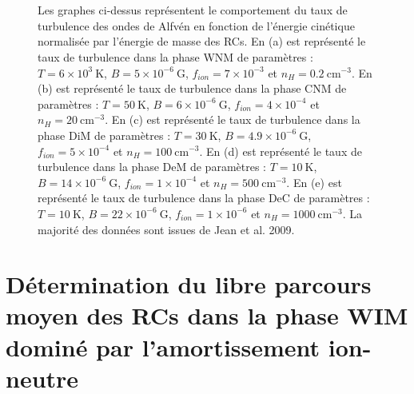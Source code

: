 \documentclass[10pt,a4paper]{article}
\begin{document}
 
\begin{figure}[t!]
  \begin{center}
     \\
      \\ 
    \caption{Les graphes ci-dessus représentent le comportement du taux de turbulence des ondes de Alfvén en fonction de l'énergie cinétique normalisée par l'énergie de masse des RCs. En (a) est représenté le taux de turbulence dans la phase WNM de paramètres : $T = 6\times 10^3~\mathrm{K}$, $B = 5\times 10^{-6}~\mathrm{G}$, $f_{ion} = 7\times 10^{-3}$ et $n_H = 0.2~\mathrm{cm}^{-3}$. En (b) est représenté le taux de turbulence dans la phase CNM de paramètres : $T = 50~\mathrm{K}$, $B = 6\times 10^{-6}~\mathrm{G}$, $f_{ion} = 4\times 10^{-4}$ et $n_H = 20~\mathrm{cm}^{-3}$. En (c) est représenté le taux de turbulence dans la phase DiM de paramètres : $T = 30~\mathrm{K}$, $B = 4.9\times 10^{-6}~\mathrm{G}$, $f_{ion} = 5\times 10^{-4}$ et $n_H = 100~\mathrm{cm}^{-3}$. En (d) est représenté le taux de turbulence dans la phase DeM de paramètres : $T = 10~\mathrm{K}$, $B = 14\times 10^{-6}~\mathrm{G}$, $f_{ion} = 1\times 10^{-4}$ et $n_H = 500~\mathrm{cm}^{-3}$. En (e) est représenté le taux de turbulence dans la phase DeC de paramètres : $T = 10~\mathrm{K}$, $B = 22\times 10^{-6}~\mathrm{G}$, $f_{ion} = 1\times 10^{-6}$ et $n_H = 1000~\mathrm{cm}^{-3}$. La majorité des données sont issues de Jean et al. 2009.}
    \label{fig:results}
  \end{center}
\end{figure}



\section*{Détermination du libre parcours moyen des RCs dans la phase WIM dominé par l'amortissement ion-neutre} 
\end{document}
